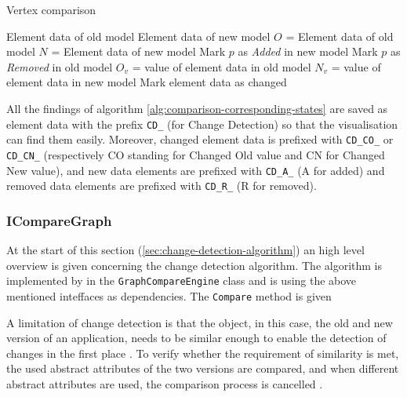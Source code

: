 \begin{algorithm}
    \caption{Vertex comparison}\label{alg:comparison-corresponding-states}
    \begin{algorithmic}
        \Require Element data of old model
        \Require Element data of new model
        \State $O$ = Element data of old model
        \State $N$ = Element data of new model
            \State Mark $p$ as \textit{Added} in new model
        \EndFor
            \State Mark $p$ as \textit{Removed} in old model
        \EndFor
            \State $O_v$ = value of element data in old model
            \State $N_v$ = value of element data in new model
               \State Mark element data as changed 
            \EndIf
        \EndFor
    \end{algorithmic}
\end{algorithm}

All the findings of algorithm \ref{alg:comparison-corresponding-states} are saved as element data with the prefix \verb|CD_| (for Change Detection) so that the visualisation can find them easily. Moreover, changed element data is prefixed with \verb|CD_CO_| or \verb|CD_CN_| (respectively CO standing for Changed Old value and CN for Changed New value), and new data elements are prefixed with \verb|CD_A_| (A for added) and removed data elements are prefixed with \verb|CD_R_| (R for removed).

\subsubsection{ICompareGraph} \label{sec:compare-algorithm}
At the start of this section (\ref{sec:change-detection-algorithm}) an high level overview is given concerning the change detection algorithm. The algorithm is implemented by in the \verb|GraphCompareEngine| class and is using the above mentioned inteffaces as dependencies. The \verb|Compare| method is given 

A limitation of change detection is that the object, in this case, the old and new version of an application, needs to be similar enough to enable the detection of changes in the first place \cite{andrews2009visual}. To verify whether the requirement of similarity is met, the used abstract attributes of the two versions are compared, and when different abstract attributes are used, the comparison process is cancelled \cite{stateDiff}. 

